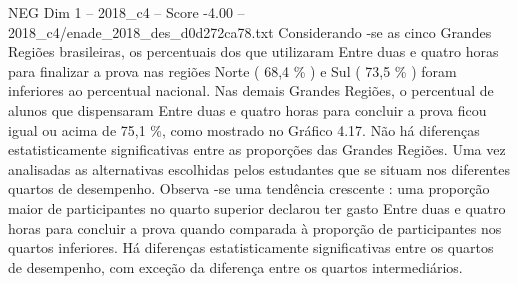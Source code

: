 \begin{textsample}{NEG Dim 1 – 2018\_c4 – Score -4.00 – 2018\_c4/enade\_2018\_des\_d0d272ca78.txt}
Considerando -se as cinco Grandes Regiões brasileiras, os percentuais dos que utilizaram Entre duas e quatro horas para finalizar a prova nas regiões Norte ( 68,4 \% ) e Sul ( 73,5 \% ) foram inferiores ao percentual nacional.
Nas demais Grandes Regiões, o percentual de alunos que dispensaram Entre duas e quatro horas para concluir a prova ficou igual ou acima de 75,1 \%, como mostrado no Gráfico 4.17.
Não há diferenças estatisticamente significativas entre as proporções das Grandes Regiões.
Uma vez analisadas as alternativas escolhidas pelos estudantes que se situam nos diferentes quartos de desempenho.
Observa -se uma tendência crescente : uma proporção maior de participantes no quarto superior declarou ter gasto Entre duas e quatro horas para concluir a prova quando comparada à proporção de participantes nos quartos inferiores.
Há diferenças estatisticamente significativas entre os quartos de desempenho, com exceção da diferença entre os quartos intermediários.

\end{textsample}
